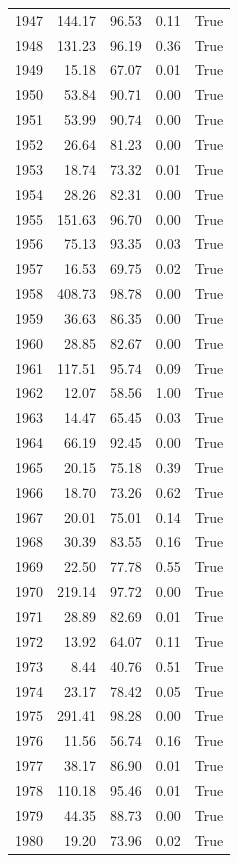 \begin{longtable}{rrrrr}
1947 & 144.17 & 96.53 & 0.11 & True \\
1948 & 131.23 & 96.19 & 0.36 & True \\
1949 & 15.18 & 67.07 & 0.01 & True \\
1950 & 53.84 & 90.71 & 0.00 & True \\
1951 & 53.99 & 90.74 & 0.00 & True \\
1952 & 26.64 & 81.23 & 0.00 & True \\
1953 & 18.74 & 73.32 & 0.01 & True \\
1954 & 28.26 & 82.31 & 0.00 & True \\
1955 & 151.63 & 96.70 & 0.00 & True \\
1956 & 75.13 & 93.35 & 0.03 & True \\
1957 & 16.53 & 69.75 & 0.02 & True \\
1958 & 408.73 & 98.78 & 0.00 & True \\
1959 & 36.63 & 86.35 & 0.00 & True \\
1960 & 28.85 & 82.67 & 0.00 & True \\
1961 & 117.51 & 95.74 & 0.09 & True \\
1962 & 12.07 & 58.56 & 1.00 & True \\
1963 & 14.47 & 65.45 & 0.03 & True \\
1964 & 66.19 & 92.45 & 0.00 & True \\
1965 & 20.15 & 75.18 & 0.39 & True \\
1966 & 18.70 & 73.26 & 0.62 & True \\
1967 & 20.01 & 75.01 & 0.14 & True \\
1968 & 30.39 & 83.55 & 0.16 & True \\
1969 & 22.50 & 77.78 & 0.55 & True \\
1970 & 219.14 & 97.72 & 0.00 & True \\
1971 & 28.89 & 82.69 & 0.01 & True \\
1972 & 13.92 & 64.07 & 0.11 & True \\
1973 & 8.44 & 40.76 & 0.51 & True \\
1974 & 23.17 & 78.42 & 0.05 & True \\
1975 & 291.41 & 98.28 & 0.00 & True \\
1976 & 11.56 & 56.74 & 0.16 & True \\
1977 & 38.17 & 86.90 & 0.01 & True \\
1978 & 110.18 & 95.46 & 0.01 & True \\
1979 & 44.35 & 88.73 & 0.00 & True \\
1980 & 19.20 & 73.96 & 0.02 & True \\

\end{longtable}
